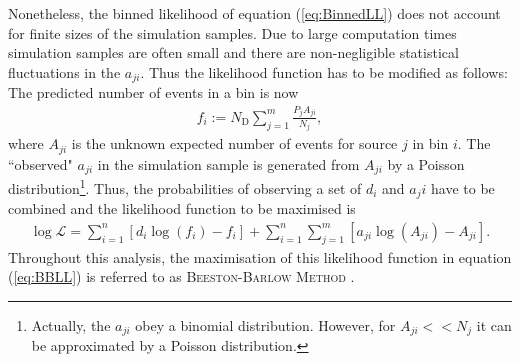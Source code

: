 Nonetheless, the binned likelihood of equation (\ref{eq:BinnedLL}) does not account for finite sizes of the simulation samples.
Due to large computation times simulation samples are often small and there are non-negligible statistical fluctuations in the $a_{ji}$.
Thus the likelihood function has to be modified as follows:
The predicted number of events in a bin is now
\begin{align}
    f_i := N_\text{D} \sum_{j=1}^{m} \frac{P_j A_{ji}}{N_j},
\end{align}
where $A_{ji}$ is the unknown expected number of events for source $j$ in bin $i$.
The ``observed" $a_{ji}$ in the simulation sample is generated from $A_{ji}$ by a Poisson distribution\footnote{Actually, the $a_{ji}$ obey a binomial distribution. However, for $A_{ji} << N_j$ it can be approximated by a Poisson distribution.}.
Thus, the probabilities of observing a set of ${d_i}$ and ${a_ji}$ have to be combined and the likelihood function to be maximised is
\begin{align}
    \log \mathcal{L} = \sum_{i=1}^{n} \left[d_i \log(f_i) - f_i\right] + \sum_{i=1}^{n} \sum_{j=1}^{m} \left[a_{ji} \log(A_{ji}) - A_{ji}\right]. \label{eq:BBLL}
\end{align}
Throughout this analysis, the maximisation of this likelihood function in equation (\ref{eq:BBLL}) is referred to as \textsc{Beeston-Barlow Method} \cite{BeestonBarlow}.
